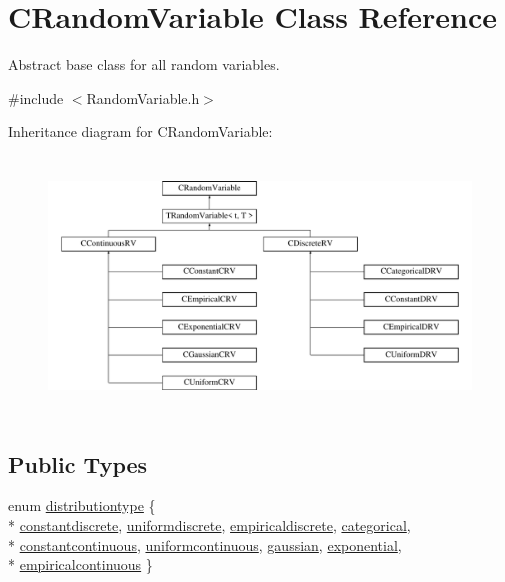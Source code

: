 \hypertarget{class_c_random_variable}{\section{C\-Random\-Variable Class Reference}
\label{class_c_random_variable}
}


Abstract base class for all random variables.  




{\ttfamily \#include $<$Random\-Variable.\-h$>$}

Inheritance diagram for C\-Random\-Variable\-:\begin{figure}[H]
\begin{center}
\leavevmode
\includegraphics[height=6.871166cm]{class_c_random_variable}
\end{center}
\end{figure}
\subsection*{Public Types}
\begin{DoxyCompactItemize}
\item 
enum \hyperlink{class_c_random_variable_a80d2a87c43847274138b51f7d713d7f1}{distributiontype} \{ \\*
\hyperlink{class_c_random_variable_a80d2a87c43847274138b51f7d713d7f1a0c10ae8009745b2c72cb941b2227d7cf}{constantdiscrete}, 
\hyperlink{class_c_random_variable_a80d2a87c43847274138b51f7d713d7f1ab043997438813a9e34acb23cf022aaac}{uniformdiscrete}, 
\hyperlink{class_c_random_variable_a80d2a87c43847274138b51f7d713d7f1a08cd8a394387e8d0ede563e0de841625}{empiricaldiscrete}, 
\hyperlink{class_c_random_variable_a80d2a87c43847274138b51f7d713d7f1ae755ca629160ee2157fa034b910793d7}{categorical}, 
\\*
\hyperlink{class_c_random_variable_a80d2a87c43847274138b51f7d713d7f1a25eeffe8d51d438d50f718001f646eb1}{constantcontinuous}, 
\hyperlink{class_c_random_variable_a80d2a87c43847274138b51f7d713d7f1a93826f5c4a5a87fa399be8af263f074c}{uniformcontinuous}, 
\hyperlink{class_c_random_variable_a80d2a87c43847274138b51f7d713d7f1a62a303e1b63a336530dd2cb66aaa98ad}{gaussian}, 
\hyperlink{class_c_random_variable_a80d2a87c43847274138b51f7d713d7f1a6c8995f47fd858e10bec17dbd1a3499c}{exponential}, 
\\*
\hyperlink{class_c_random_variable_a80d2a87c43847274138b51f7d713d7f1a984f26dbaaad0e3aa0dd565c9908912a}{empiricalcontinuous}
 \}
\end{DoxyCompactItemize}
